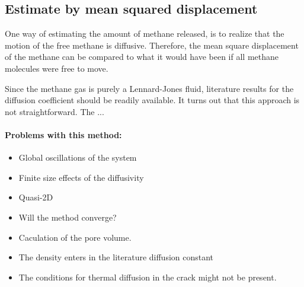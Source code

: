 \subsection{Estimate by mean squared displacement}
One way of estimating the amount of methane released, is to realize that the motion of the free methane is diffusive. Therefore, the mean square displacement of the methane can be compared to what it would have been if all methane molecules were free to move.

Since the methane gas is purely a Lennard-Jones fluid, literature results for the diffusion coefficient should be readily available. It turns out that this approach is not straightforward. The ...

\paragraph{Problems with this method:}
\begin{itemize}
\item Global oscillations of the system
\item Finite size effects of the diffusivity
\item Quasi-2D
\item Will the method converge?
\item Caculation of the pore volume.
\item The density enters in the literature diffusion constant
\item The conditions for thermal diffusion in the crack might not be present. 
\end{itemize}

